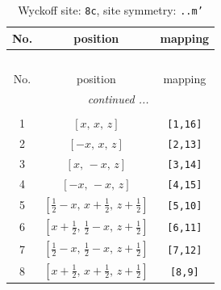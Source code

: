 \documentclass[fleqn,8pt]{jsarticle}
\begin{document}
\renewcommand{\arraystretch}{1.2}
\begin{longtable}{ccc}
\caption{Wyckoff site: {\tt 8c}, site symmetry: {\tt ..m'}}
 \\
 \hline \hline
No. & position & mapping \\ \hline \endfirsthead

\multicolumn{2}{l}{\tablename\ \thetable{}} \\
 \hline \hline
No. & position & mapping \\ \hline \endhead

 \hline \hline
\multicolumn{2}{r}{\footnotesize\it continued ...} \\ \endfoot

 \hline \hline
\multicolumn{2}{r}{} \\ \endlastfoot

1 & $\left[ x,\, x,\, z \right]$ & {\tt [1,16]} \\ \hline
2 & $\left[ - x,\, x,\, z \right]$ & {\tt [2,13]} \\ \hline
3 & $\left[ x,\, - x,\, z \right]$ & {\tt [3,14]} \\ \hline
4 & $\left[ - x,\, - x,\, z \right]$ & {\tt [4,15]} \\ \hline
5 & $\left[ \frac{1}{2} - x,\, x + \frac{1}{2},\, z + \frac{1}{2} \right]$ & {\tt [5,10]} \\ \hline
6 & $\left[ x + \frac{1}{2},\, \frac{1}{2} - x,\, z + \frac{1}{2} \right]$ & {\tt [6,11]} \\ \hline
7 & $\left[ \frac{1}{2} - x,\, \frac{1}{2} - x,\, z + \frac{1}{2} \right]$ & {\tt [7,12]} \\ \hline
8 & $\left[ x + \frac{1}{2},\, x + \frac{1}{2},\, z + \frac{1}{2} \right]$ & {\tt [8,9]} \\
\end{longtable}
\renewcommand{\arraystretch}{1.2}
\end{document}
